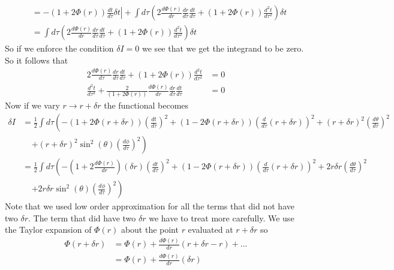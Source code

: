 \documentclass[11pt]{article}
\numberwithin{equation}{section}
\begin{document}
\begin{enumerate}[(a)]
\begin{align*}
&=  -\left.(1+2\Phi(r))\frac{dt}{d\tau}\delta t\right| + \int d\tau \left(2\frac{d\Phi(r)}{dr}\frac{dr}{d\tau}\frac{dt}{d\tau} + (1+2\Phi(r))\frac{d^2t}{d\tau^2}\right)\delta t\\
&=  \int d\tau \left(2\frac{d\Phi(r)}{dr}\frac{dr}{d\tau}\frac{dt}{d\tau} + (1+2\Phi(r))\frac{d^2t}{d\tau^2}\right)\delta t
\end{align*}
So if we enforce the condition $\delta I = 0$ we see that we get the integrand to be zero. So it follows that
\begin{align*}
2\frac{d\Phi(r)}{d\tau}\frac{dr}{d\tau}\frac{dt}{d\tau} + (1+2\Phi(r))\frac{d^2t}{d\tau^2} &= 0\\
\frac{d^2t}{d\tau^2} + \frac{2}{(1+2\Phi(r))}\frac{d\Phi(r)}{dr}\frac{dr}{d\tau}\frac{dt}{d\tau}  &= 0
\end{align*}
Now if we vary $r\rightarrow r+\delta r$ the functional becomes
\begin{align*}
\delta I &= \frac{1}{2}\int d\tau\left(-(1+2\Phi(r+\delta r))\left(\frac{dt}{d\tau}\right)^2 + (1-2\Phi(r+\delta r))\left(\frac{d}{d\tau}(r+\delta r)\right)^2 + (r+\delta r)^2\left(\frac{d\theta}{d\tau}\right)^2\right.\\
&\ \ \ \ \ \left. +(r+\delta r)^2\sin^2(\theta)\left(\frac{d\phi}{d\tau}\right)^2\right)\\
&= \frac{1}{2}\int d\tau\left(-\left(1+2\frac{d\Phi(r)}{dr}\right)(\delta r)\left(\frac{dt}{d\tau}\right)^2 + \left(1-2\Phi(r+\delta r)\right)\left(\frac{d}{d\tau}(r+\delta r)\right)^2 + 2r\delta r\left(\frac{d\theta}{d\tau}\right)^2 \right. \\
& \ \ \ \ \ \left. + 2r\delta r\sin^2(\theta)\left(\frac{d\phi}{d\tau}\right)^2\right)
\end{align*}
Note that we used low order approximation for all the terms that did not have two $\delta r$. The term that did have two $\delta r$ we have to treat more carefully. We use the Taylor expansion of $\Phi(r)$ about the point $r$ evaluated at $r+\delta r$ so
\begin{align*}
\Phi(r+\delta r) &= \Phi(r) + \frac{d\Phi(r)}{dr}(r+\delta r - r) + ...\\
&= \Phi(r) + \frac{d\Phi(r)}{dr}(\delta r)

\end{align*}
\end{enumerate}
\end{document}
